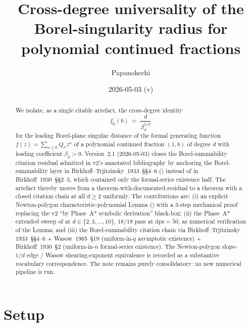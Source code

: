 \documentclass[11pt,reqno]{amsart}
\title[Cross-degree universality of the Borel-singularity radius]
      {Cross-degree universality of the Borel-singularity radius
       for polynomial continued fractions}
\author{Papanokechi}
\date{2026-05-03 (v\version)}
\theoremstyle{plain}
\theoremstyle{definition}
\theoremstyle{remark}
\newcommand{\dps}{\mathrm{dps}}
\begin{document}
\begin{abstract}
We isolate, as a single citable artefact, the cross-degree
identity
\[
  \xi_0(b) \;=\; \frac{d}{\beta_d^{1/d}}
\]
for the leading Borel-plane singular distance of the formal
generating function $f(z) = \sum_{n\ge 0} Q_n z^n$ of a
polynomial continued fraction $(1, b)$ of degree $d$ with
leading coefficient $\beta_d > 0$. Version~2.1 (2026-05-03)
closes the Borel-summability citation residual admitted in
v2's annotated bibliography by anchoring the
Borel-summability layer in Birkhoff--Trjitzinsky~1933~\S\S4--6
(\cite{birkhoff_trjitzinsky_1933}) instead of in
Birkhoff~1930~\S\S2--3, which contained only the formal-series
existence half. The artefact thereby moves from a
theorem-with-documented-residual to a theorem with a closed
citation chain at all $d \ge 2$ uniformly. The contributions
are: (i) an explicit Newton-polygon characteristic-polynomial
Lemma () with a 3-step mechanical
proof replacing the v2 ``by Phase~A* symbolic derivation''
black-box; (ii) the Phase~A* extended sweep of
\cite{siarc_q20a_phase_c_resume} at
$d \in \{2,3,\dots,10\}$, $18/18$ pass at $\dps = 50$, as
numerical verification of the Lemma; and (iii) the
Borel-summability citation chain via Birkhoff--Trjitzinsky
1933~\S\S4--6 + Wasow~1965~\S19 (uniform-in-$q$ asymptotic
existence) + Birkhoff~1930~\S2 (uniform-in-$n$ formal-series
existence). The Newton-polygon slope-$1/d$ edge / Wasow
shearing-exponent equivalence is recorded as a substantive
vocabulary correspondence. The note remains purely
consolidatory: no new numerical pipeline is run.
\end{abstract}

\maketitle

\section{Setup}
\label{sec:setup}
\end{document}
